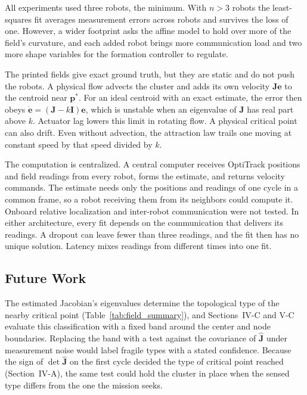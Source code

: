 \documentclass[lettersize,journal]{IEEEtran}
\begin{document}
All experiments used three robots, the minimum. With $n > 3$ robots the least-squares fit averages measurement errors across robots and survives the loss of one. However, a wider footprint asks the affine model to hold over more of the field's curvature, and each added robot brings more communication load and two more shape variables for the formation controller to regulate.

The printed fields give exact ground truth, but they are static and do not push the robots. A physical flow advects the cluster and adds its own velocity $\mathbf{J}\mathbf{e}$ to the centroid near $\mathbf{p}^*$. For an ideal centroid with an exact estimate, the error then obeys $\dot{\mathbf{e}} = (\mathbf{J} - k\mathbf{I})\mathbf{e}$, which is unstable when an eigenvalue of $\mathbf{J}$ has real part above $k$. Actuator lag lowers this limit in rotating flow. A physical critical point can also drift. Even without advection, the attraction law trails one moving at constant speed by that speed divided by $k$.

The computation is centralized. A central computer receives OptiTrack positions and field readings from every robot, forms the estimate, and returns velocity commands. The estimate needs only the positions and readings of one cycle in a common frame, so a robot receiving them from its neighbors could compute it. Onboard relative localization and inter-robot communication were not tested. In either architecture, every fit depends on the communication that delivers its readings. A dropout can leave fewer than three readings, and the fit then has no unique solution. Latency mixes readings from different times into one fit.

\subsection{Future Work}

The estimated Jacobian's eigenvalues determine the topological type of the nearby critical point (Table~\ref{tab:field_summary}), and Sections~IV-C and V-C evaluate this classification with a fixed band around the center and node boundaries. Replacing the band with a test against the covariance of $\hat{\mathbf{J}}$ under measurement noise would label fragile types with a stated confidence. Because the sign of $\det\hat{\mathbf{J}}$ on the first cycle decided the type of critical point reached (Section~IV-A), the same test could hold the cluster in place when the sensed type differs from the one the mission seeks.
\end{document}

